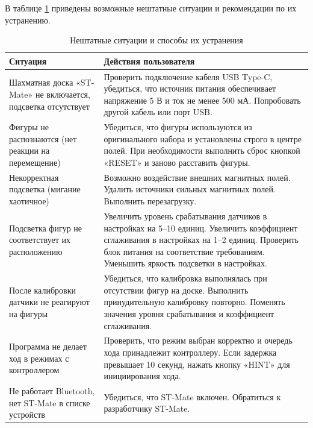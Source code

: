 \documentclass[a4paper,12pt]{article}
\begin{document}
В таблице \ref{tab:errors} приведены возможные нештатные ситуации и рекомендации по их устранению.
\begin{table}[H]
    \centering
    \begin{tabular}{|p{}|p{}|}
        \hline
        \textbf{Ситуация} & \textbf{Действия пользователя} \\
        \hline
        Шахматная доска «ST-Mate» не включается, подсветка отсутствует & 
        Проверить подключение кабеля USB Type-C, убедиться, что источник питания обеспечивает напряжение 5 В и ток не менее 500 мА.
        Попробовать другой кабель или порт USB. \\
        \hline
        Фигуры не распознаются (нет реакции на перемещение) & 
        Убедиться, что фигуры используются из оригинального набора и установлены строго в центре полей. 
        При необходимости выполнить сброс кнопкой «RESET» и заново расставить фигуры. \\
        \hline
        Некорректная подсветка (мигание хаотичное) & 
        Возможно воздействие внешних магнитных полей. 
        Удалить источники сильных магнитных полей. 
        Выполнить перезагрузку. \\
        \hline
        Подсветка фигур не соответствует их расположению &
        Увеличить уровень срабатывания датчиков в настройках на 5–10 единиц.
        Увеличить коэффициент сглаживания в настройках на 1–2 единиц.
        Проверить блок питания на соответствие требованиям.
        Уменьшить яркость подсветки в настройках. \\
        \hline
        После калибровки датчики не реагируют на фигуры & 
        Убедиться, что калибровка выполнялась при отсутствии фигур на доске. 
        Выполнить принудительную калибровку повторно. 
        Поменять значения уровня срабатывания и коэффициент сглаживания. \\
        \hline
        Программа не делает ход в режимах с контроллером & 
        Проверить, что режим выбран корректно и очередь хода принадлежит контроллеру. 
        Если задержка превышает 10 секунд, нажать кнопку «HINT» для инициирования хода. \\
        \hline
        Не работает Bluetooth, нет ST-Mate в списке устройств &
        Убедиться, что ST-Mate включен. Обратиться к разработчику ST-Mate. \\
        \hline
    \end{tabular}
    \caption{Нештатные ситуации и способы их устранения}
    \label{tab:errors}
\end{table}
\end{document}
